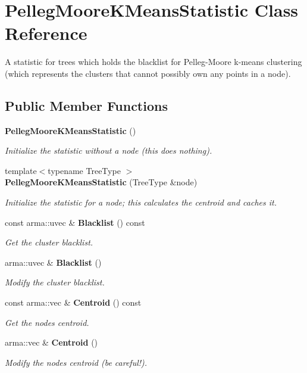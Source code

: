 \section{Pelleg\+Moore\+K\+Means\+Statistic Class Reference}
\label{classmlpack_1_1kmeans_1_1PellegMooreKMeansStatistic}


A statistic for trees which holds the blacklist for Pelleg-\/\+Moore k-\/means clustering (which represents the clusters that cannot possibly own any points in a node).  


\subsection*{Public Member Functions}
\begin{DoxyCompactItemize}
\item 
\textbf{ Pelleg\+Moore\+K\+Means\+Statistic} ()
\begin{DoxyCompactList}\small\item\em Initialize the statistic without a node (this does nothing). \end{DoxyCompactList}\item 
{\footnotesize template$<$typename Tree\+Type $>$ }\\\textbf{ Pelleg\+Moore\+K\+Means\+Statistic} (Tree\+Type \&node)
\begin{DoxyCompactList}\small\item\em Initialize the statistic for a node; this calculates the centroid and caches it. \end{DoxyCompactList}\item 
const arma\+::uvec \& \textbf{ Blacklist} () const
\begin{DoxyCompactList}\small\item\em Get the cluster blacklist. \end{DoxyCompactList}\item 
arma\+::uvec \& \textbf{ Blacklist} ()
\begin{DoxyCompactList}\small\item\em Modify the cluster blacklist. \end{DoxyCompactList}\item 
const arma\+::vec \& \textbf{ Centroid} () const
\begin{DoxyCompactList}\small\item\em Get the node\textquotesingle{}s centroid. \end{DoxyCompactList}\item 
arma\+::vec \& \textbf{ Centroid} ()
\begin{DoxyCompactList}\small\item\em Modify the node\textquotesingle{}s centroid (be careful!). \end{DoxyCompactList}\end{DoxyCompactItemize}


